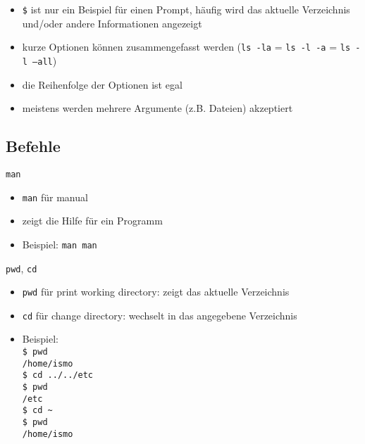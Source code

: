     \begin{frame}
      \begin{itemize}
        \item \texttt{\$} ist nur ein Beispiel für einen Prompt, häufig wird das aktuelle Verzeichnis und/oder andere Informationen angezeigt
        \item kurze Optionen können zusammengefasst werden (\texttt{ls~-la} = \texttt{ls -l -a} = \texttt{ls -l --all})
        \item die Reihenfolge der Optionen ist egal
        \item meistens werden mehrere Argumente (z.B. Dateien) akzeptiert
      \end{itemize}
    \end{frame}

  \subsection{Befehle}
    \begin{frame}{\texttt{man}}
      \begin{itemize}
        \item \texttt{man} für manual
        \item zeigt die Hilfe für ein Programm
        \item Beispiel: \texttt{man man}
      \end{itemize}
    \end{frame}

    \begin{frame}{\texttt{pwd}, \texttt{cd}}
      \begin{itemize}
        \item \texttt{pwd} für print working directory: zeigt das aktuelle Verzeichnis
        \item \texttt{cd} für change directory: wechselt in das angegebene Verzeichnis
        \item Beispiel:\\
          \texttt{\$ pwd\\
                  /home/ismo\\
                  \$ cd ../../etc\\
                  \$ pwd\\
                  /etc\\
                  \$ cd \textasciitilde\\
                  \$ pwd\\
                  /home/ismo}
      \end{itemize}
    \end{frame}

